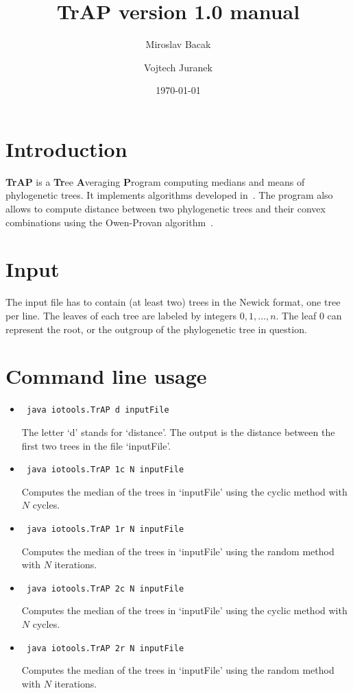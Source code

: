 \documentclass[a4paper,12pt]{amsart}
\title{TrAP version 1.0 manual}
\author{Miroslav Bacak \and Vojtech Juranek}
\date{\today}
\begin{document}
\maketitle

\section{Introduction}

\textbf{TrAP} is a \textbf{Tr}ee \textbf{A}veraging \textbf{P}rogram computing medians and means of phylogenetic trees. It implements algorithms developed in~\cite{mm}. The program also allows to compute distance between two phylogenetic trees and their convex combinations using the Owen-Provan algorithm~\cite{owenprovan}.


\section{Input}
The input file has to contain (at least two) trees in the Newick format, one tree per line. The leaves of each tree are labeled by integers $0,1,\dots,n.$ The leaf $0$ can represent the root, or the outgroup of the phylogenetic tree in question.

\section{Command line usage}

\begin{itemize}
\item
\begin{verbatim}
 java iotools.TrAP d inputFile
\end{verbatim}
The letter `d' stands for `distance'. The output is the distance between the first two trees in the file `inputFile'.

\item
\begin{verbatim}
 java iotools.TrAP 1c N inputFile
\end{verbatim}
Computes the median of the trees in `inputFile' using the cyclic method with $N$ cycles.

\item
\begin{verbatim}
 java iotools.TrAP 1r N inputFile
\end{verbatim}
Computes the median of the trees in `inputFile' using the random method with $N$ iterations.

\item
\begin{verbatim}
 java iotools.TrAP 2c N inputFile
\end{verbatim}
Computes the median of the trees in `inputFile' using the cyclic method with $N$ cycles.

\item
\begin{verbatim}
 java iotools.TrAP 2r N inputFile
\end{verbatim}
Computes the median of the trees in `inputFile' using the random method with $N$ iterations.

\end{itemize}
\end{document}

